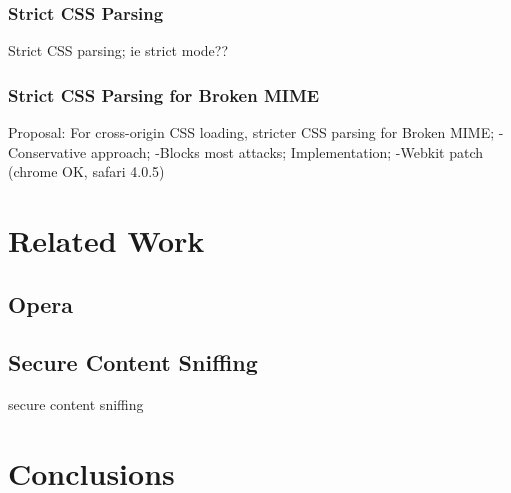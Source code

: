 \documentclass{acm_proc_article-sp}
\begin{document}
\subsubsection{Strict CSS Parsing}
Strict CSS parsing;
ie strict mode??

\subsubsection{Strict CSS Parsing for Broken MIME}
Proposal: For cross-origin CSS loading, stricter CSS parsing for Broken MIME;
-Conservative approach;
-Blocks most attacks;
Implementation;
-Webkit patch (chrome OK, safari 4.0.5)

\section{Related Work}

\subsection{Opera}

\subsection{Secure Content Sniffing}
secure content sniffing\cite{securecontentsniffing}

\section{Conclusions}




\end{document}
